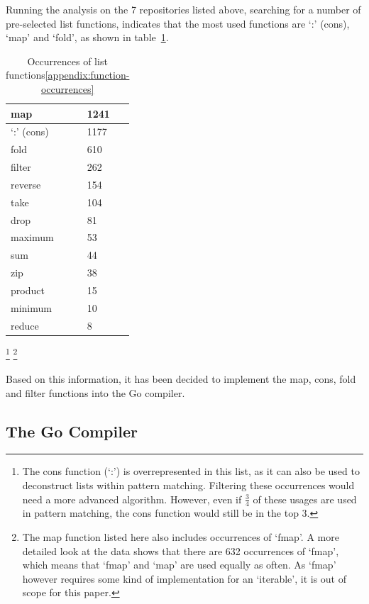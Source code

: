 Running the analysis on the 7 repositories listed above, searching for a number
of pre-selected list functions, indicates that the most used functions are `:'
(cons), `map' and `fold', as shown in table~\ref{tab:occurrences-list-funcs}.

\begin{table}[htb]
\centering
\caption{Occurrences of list functions\ref{appendix:function-occurrences}}\label{tab:occurrences-list-funcs}
\begin{tabular}{ll}
\toprule
map & 1241 \\
\midrule
`:' (cons) & 1177 \\
\midrule
fold & 610 \\
\midrule
filter & 262 \\
\midrule
reverse & 154 \\
\midrule
take & 104 \\
\midrule
drop & 81 \\
\midrule
maximum & 53 \\
\midrule
sum & 44 \\
\midrule
zip & 38 \\
\midrule
product & 15 \\
\midrule
minimum & 10 \\
\midrule
reduce & 8
\end{tabular}
\end{table}
\footnote{The cons function (`:') is overrepresented in this list,
    as it can also be used to deconstruct lists within pattern matching. Filtering
    these occurrences would need a more advanced algorithm. However, even if $\tfrac{3}{4}$
    of these usages are used in pattern matching, the cons function would still be
    in the top 3.
}
\footnote{The map function listed here also includes occurrences of `fmap'. A more
    detailed look at the data shows that there are 632 occurrences of `fmap', which
    means that `fmap' and `map' are used equally as often. As `fmap' however requires
    some kind of implementation for an `iterable', it is out of scope for this paper.
}

Based on this information, it has been decided to implement the map, cons, fold
and filter functions into the Go compiler.

\subsection{The Go Compiler}

